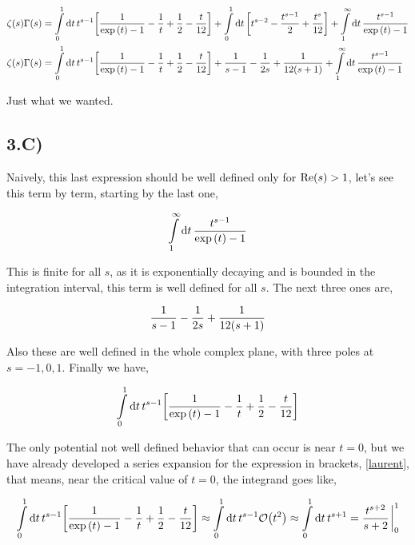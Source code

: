 \begin{align*}
    \zeta(s)\Gamma\qty(s)&=\int\limits_0^1\dd{t}t^{s-1}\qty[\frac{1}{\exp\qty(t)-1}-\frac1t+\frac12-\frac{t}{12}]+\int\limits_0^1\dd{t}\qty[t^{s-2}-\frac{t^{s-1}}{2}+\frac{t^s}{12}]+\int\limits_1^\infty\dd{t}\frac{t^{s-1}}{\exp\qty(t)-1}\\
    \zeta(s)\Gamma\qty(s)&=\int\limits_0^1\dd{t}t^{s-1}\qty[\frac{1}{\exp\qty(t)-1}-\frac1t+\frac12-\frac{t}{12}]+\frac{1}{s-1}-\frac{1}{2s}+\frac{1}{12\qty(s+1)}+\int\limits_1^\infty\dd{t}\frac{t^{s-1}}{\exp\qty(t)-1}   
\end{align*}

Just what we wanted.

\subsection{3.C)}

Naively, this last expression should be well defined only for $\textnormal{Re}\qty(s)>1$, let's see this term by term, starting by the last one,

\begin{align*}
    \int\limits_1^\infty\dd{t}\frac{t^{s-1}}{\exp\qty(t)-1}
\end{align*}

This is finite for all $s$, as it is exponentially decaying and is bounded in the integration interval, this term is well defined for all $s$. 
The next three ones are,

\begin{align*}
    \frac{1}{s-1}-\frac{1}{2s}+\frac{1}{12\qty(s+1)}
\end{align*}

Also these are well defined in the whole complex plane, with three poles at $s=-1,0,1$. Finally we have,

\begin{align*}
    \int\limits_0^1\dd{t}t^{s-1}\qty[\frac{1}{\exp\qty(t)-1}-\frac1t+\frac12-\frac{t}{12}]
\end{align*}

The only potential not well defined behavior that can occur is near $t=0$, but we have already developed a 
series expansion for the expression in brackets, \ref{laurent}, that means, near the critical value of $t=0$, 
the integrand goes like,

\begin{align*}
    \int\limits_0^1\dd{t}t^{s-1}\qty[\frac{1}{\exp\qty(t)-1}-\frac1t+\frac12-\frac{t}{12}]\approx\int\limits_0^1\dd{t}t^{s-1}\mathcal O\qty(t^2)\approx \int\limits_0^1\dd{t}t^{s+1}=\frac{t^{s+2}}{s+2}\eval_0^1
\end{align*}

